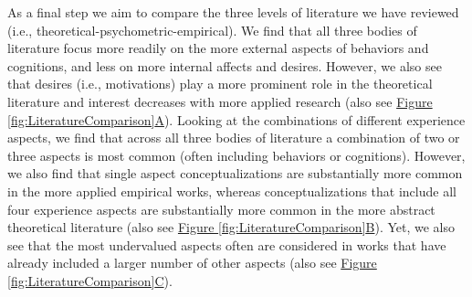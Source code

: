 \documentclass[man, 12pt, a4paper, mask]{apa7}
\newcommand{\fgrref}[2][]{\hyperref[#2]{Figure \ref*{#2}#1}}
\begin{document}
As a final step we aim to compare the three levels of literature we have
reviewed (i.e., theoretical-psychometric-empirical). We find that all
three bodies of literature focus more readily on the more external
aspects of behaviors and cognitions, and less on more internal affects
and desires. However, we also see that desires (i.e., motivations) play
a more prominent role in the theoretical literature and interest
decreases with more applied research (also see
\fgrref[A]{fig:LiteratureComparison}). Looking at the combinations of
different experience aspects, we find that across all three bodies of
literature a combination of two or three aspects is most common (often
including behaviors or cognitions). However, we also find that single
aspect conceptualizations are substantially more common in the more
applied empirical works, whereas conceptualizations that include all
four experience aspects are substantially more common in the more
abstract theoretical literature (also see
\fgrref[B]{fig:LiteratureComparison}). Yet, we also see that the most
undervalued aspects often are considered in works that have already
included a larger number of other aspects (also see
\fgrref[C]{fig:LiteratureComparison}).
\end{document}
